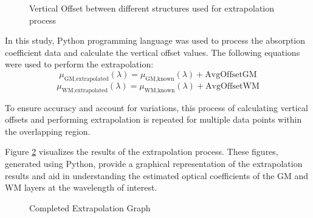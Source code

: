 \documentclass[journal,twoside,web]{ieeecolor}
\begin{document}
\begin{figure}[!htb]
    \caption{\label{fig:Overlap} Vertical Offset between different structures used for extrapolation process}
\end{figure}
In this study, Python programming language was used to process the absorption coefficient data and calculate the vertical offset values. 
The following equations were used to perform the extrapolation:
\begin{equation}
    \label{eq:GMextrapolate}
    \mu_{\text{GM,extrapolated}}(\lambda) = \mu_{\text{GM,known}}(\lambda) + \text{AvgOffsetGM}
\end{equation}
\begin{equation}
    \label{eq:WMextrapolate}
    \mu_{\text{WM,extrapolated}}(\lambda) = \mu_{\text{WM,known}}(\lambda) + \text{AvgOffsetWM}
\end{equation}

To ensure accuracy and account for variations, this process of calculating vertical offsets and performing extrapolation is repeated for 
multiple data points within the overlapping region.

Figure \ref{fig:Extrapolation} visualizes the results of the extrapolation process.  These figures, generated using Python, provide a graphical representation of the 
extrapolation results and aid in understanding the estimated optical coefficients of the GM and WM layers at the wavelength of interest.
\begin{figure}[htb]
    \caption{\label{fig:Extrapolation} Completed Extrapolation Graph}
\end{figure}
\end{document}
